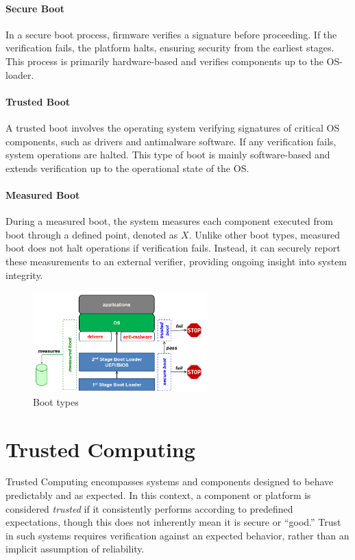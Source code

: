 \paragraph{Secure Boot} In a secure boot process, firmware verifies 
a signature before proceeding. If the verification fails, the platform 
halts, ensuring security from the earliest stages. This process is 
primarily hardware-based and verifies components up to the 
OS-loader.

\paragraph{Trusted Boot} A trusted boot involves the operating 
system verifying signatures of critical OS components, such as 
drivers and antimalware software. If any verification fails, system 
operations are halted. This type of boot is mainly software-based 
and extends verification up to the operational state of the OS.

\paragraph{Measured Boot} During a measured boot, the system 
measures each component executed from boot through a defined 
point, denoted as \(X\). Unlike other boot types, measured boot 
does not halt operations if verification fails. Instead, it can securely 
report these measurements to an external verifier, providing 
ongoing insight into system integrity.

\begin{figure}[H]
  \centering
  \includegraphics[width=0.6\textwidth]{img/boot types.png}
  \caption{Boot types}
\end{figure}

\section{Trusted Computing}

Trusted Computing encompasses systems and components designed 
to behave predictably and as expected. In this context, a component 
or platform is considered \textit{trusted} if it consistently performs 
according to predefined expectations, though this does not inherently 
mean it is secure or “good.” Trust in such systems requires verification 
against an expected behavior, rather than an implicit assumption of 
reliability.

